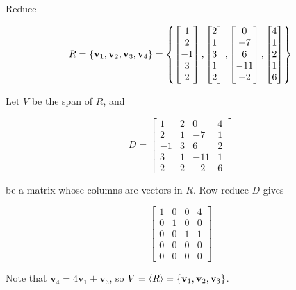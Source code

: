 \documentclass[a4paper,12pt]{article}
\begin{document}
\begin{exm}
  Reduce

  $$R=\left\{ \mathbf{v}_{1},\mathbf{v}_{2},\mathbf{v}_{3},\mathbf{v}_{4}\right\}=\left\{ \begin{bmatrix}
    1\\
    2\\
    -1\\
    3\\
    2
  \end{bmatrix},\begin{bmatrix}
    2\\
    1\\
    3\\
    1\\
    2
  \end{bmatrix},\begin{bmatrix}
    0\\
    -7\\
    6\\
    -11\\
    -2
  \end{bmatrix},\begin{bmatrix}
    4\\
    1\\
    2\\
    1\\
    6
  \end{bmatrix}\right\}$$\s

  \ans Let $V$ be the span of $R$, and

  $$D=\begin{bmatrix}
    1 & 2 & 0 & 4\\
    2 & 1 & -7 & 1\\
    -1 & 3 & 6 & 2\\
    3 & 1 & -11 & 1\\
    2 & 2 & -2 & 6
  \end{bmatrix}$$\s

  be a matrix whose columns are vectors in $R$. Row-reduce $D$ gives

  $$\begin{bmatrix}
    1 & 0 & 0 & 4\\
    0 & 1 & 0 & 0\\
    0 & 0 & 1 & 1\\
    0 & 0 & 0 & 0\\
    0 & 0 & 0 & 0
  \end{bmatrix}$$\s

  Note that $\mathbf{v}_{4}=4\mathbf{v}_{1}+\mathbf{v}_{3}$, so $V=\left\langle R\right\rangle=\left\{ \mathbf{v}_{1},\mathbf{v}_{2},\mathbf{v}_{3}\right\}$.
\end{exm}\n
\end{document}
